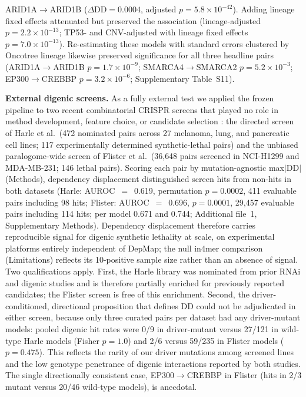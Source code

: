 \documentclass[11pt,a4paper]{article}
\begin{document}
ARID1A$\rightarrow$ARID1B ($\Delta\text{DD} = 0.0004$, adjusted $p = 5.8 \times 10^{-42}$). Adding lineage fixed effects attenuated but preserved the association (lineage-adjusted $p=2.2\times10^{-13}$; TP53- and CNV-adjusted with lineage fixed effects $p=7.0\times10^{-13}$). Re-estimating these models with standard errors clustered by Oncotree lineage likewise preserved significance for all three headline pairs (ARID1A$\rightarrow$ARID1B $p=1.7\times10^{-9}$; SMARCA4$\rightarrow$SMARCA2 $p=5.2\times10^{-3}$; EP300$\rightarrow$CREBBP $p=3.2\times10^{-6}$; Supplementary Table~S11).

\textbf{External digenic screens.} As a fully external test we applied the frozen pipeline to two recent combinatorial CRISPR screens that played no role in method development, feature choice, or candidate selection \cite{Harle2025,Flister2025}: the directed screen of Harle et al.\ (472 nominated pairs across 27 melanoma, lung, and pancreatic cell lines; 117 experimentally determined synthetic-lethal pairs) and the unbiased paralogome-wide screen of Flister et al.\ (36{,}648 pairs screened in NCI-H1299 and MDA-MB-231; 146 lethal pairs). Scoring each pair by mutation-agnostic max$|$DD$|$ (Methods), dependency displacement distinguished screen hits from non-hits in both datasets (Harle: AUROC~$=$~0.619, permutation $p=0.0002$, 411 evaluable pairs including 98 hits; Flister: AUROC~$=$~0.696, $p=0.0001$, 29{,}457 evaluable pairs including 114 hits; per model 0.671 and 0.744; Additional file~1, Supplementary Methods). Dependency displacement therefore carries reproducible signal for digenic synthetic lethality at scale, on experimental platforms entirely independent of DepMap; the null in4mer comparison (Limitations) reflects its 10-positive sample size rather than an absence of signal. Two qualifications apply. First, the Harle library was nominated from prior RNAi and digenic studies and is therefore partially enriched for previously reported candidates; the Flister screen is free of this enrichment. Second, the driver-conditioned, directional proposition that defines DD could not be adjudicated in either screen, because only three curated pairs per dataset had any driver-mutant models: pooled digenic hit rates were 0/9 in driver-mutant versus 27/121 in wild-type Harle models (Fisher $p=1.0$) and 2/6 versus 59/235 in Flister models ($p=0.475$). This reflects the rarity of our driver mutations among screened lines and the low genotype penetrance of digenic interactions reported by both studies. The single directionally consistent case, EP300$\rightarrow$CREBBP in Flister (hits in 2/3 mutant versus 20/46 wild-type models), is anecdotal.
\end{document}
